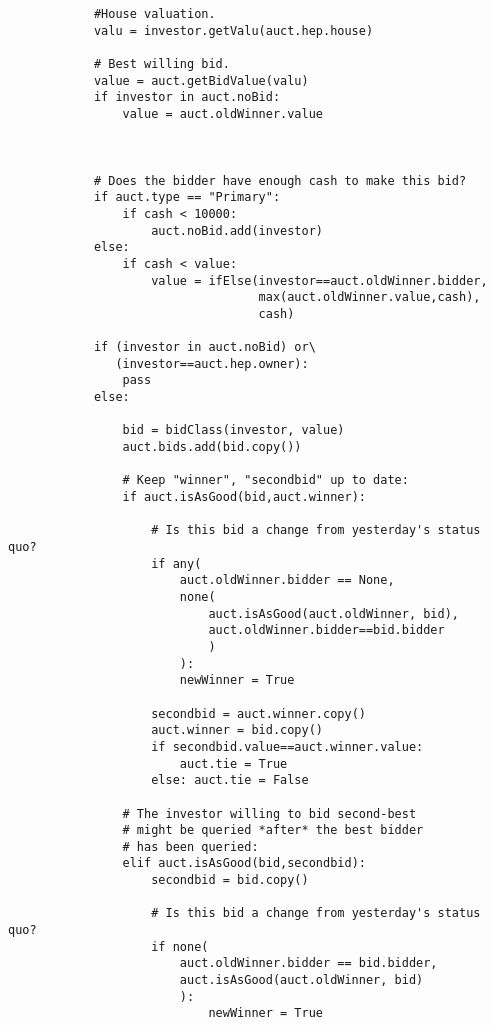 \begin{lstlisting}
            #House valuation.
            valu = investor.getValu(auct.hep.house)

            # Best willing bid.
            value = auct.getBidValue(valu)
            if investor in auct.noBid:
                value = auct.oldWinner.value
            
                               

            # Does the bidder have enough cash to make this bid?
            if auct.type == "Primary":
                if cash < 10000:
                    auct.noBid.add(investor)                          
            else:
                if cash < value:
                    value = ifElse(investor==auct.oldWinner.bidder,
                                   max(auct.oldWinner.value,cash),
                                   cash)         

            if (investor in auct.noBid) or\
               (investor==auct.hep.owner):
                pass
            else:
                    
                bid = bidClass(investor, value)
                auct.bids.add(bid.copy())

                # Keep "winner", "secondbid" up to date:
                if auct.isAsGood(bid,auct.winner):

                    # Is this bid a change from yesterday's status quo?
                    if any(
                        auct.oldWinner.bidder == None,
                        none(
                            auct.isAsGood(auct.oldWinner, bid),
                            auct.oldWinner.bidder==bid.bidder
                            )
                        ):
                        newWinner = True

                    secondbid = auct.winner.copy()
                    auct.winner = bid.copy()
                    if secondbid.value==auct.winner.value:
                        auct.tie = True
                    else: auct.tie = False

                # The investor willing to bid second-best
                # might be queried *after* the best bidder
                # has been queried:
                elif auct.isAsGood(bid,secondbid):
                    secondbid = bid.copy()

                    # Is this bid a change from yesterday's status quo?
                    if none(
                        auct.oldWinner.bidder == bid.bidder,
                        auct.isAsGood(auct.oldWinner, bid)
                        ):
                            newWinner = True
                    

\end{lstlisting}
